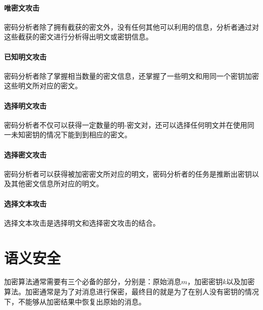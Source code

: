 \paragraph{唯密文攻击} 密码分析者除了拥有截获的密文外，没有任何其他可以利用的信息，分析者通过对这些截获的密文进行分析得出明文或密钥信息。
\paragraph{已知明文攻击} 密码分析者除了掌握相当数量的密文信息，还掌握了一些明文和用同一个密钥加密这些明文所对应的密文。
\paragraph{选择明文攻击} 密码分析者不仅可以获得一定数量的明-密文对，还可以选择任何明文并在使用同一未知密钥的情况下能到到相应的密文。
\paragraph{选择密文攻击} 密码分析者可以获得被加密密文所对应的明文，密码分析者的任务是推断出密钥以及其他密文信息所对应的明文。
\paragraph{选择文本攻击} 选择文本攻击是选择明文和选择密文攻击的结合。

\section{语义安全}
加密算法通常需要有三个必备的部分，分别是：原始消息$m$，加密密钥$k$以及加密算法。加密通常是为了对消息进行保密，最终目的就是为了在别人没有密钥的情况下，不能够从加密结果中恢复出原始的消息。

